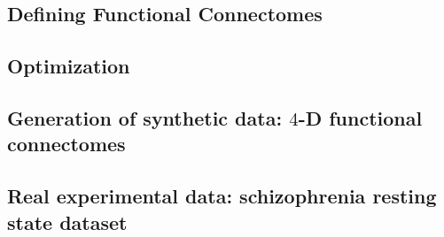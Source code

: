 \subsection{Defining Functional Connectomes}\label{subsec:FC,def}




\subsection{Optimization}\label{subsec:optim}


\subsection{Generation of synthetic data: $4$-D functional connectomes}
\label{subsec:synthetic,4d,conn}


\subsection{Real experimental data: schizophrenia resting state dataset}
\label{subsec:real,data}

